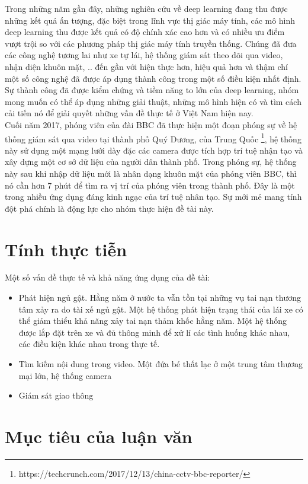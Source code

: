 \documentclass[a4paper]{report}
\begin{document}
	Trong những năm gần đây, những nghiên cứu về deep learning đang thu được
những kết quả ấn tượng, đặc biệt trong lĩnh vực thị giác máy tính, các mô 
hình deep learning thu được kết quả có độ chính xác cao hơn và có nhiều ưu 
điểm vượt trội so với các
phương pháp thị giác máy tính truyền thống. Chúng đã đưa các công nghệ tương lai
 như xe tự lái, hệ thống giám sát theo dõi qua video, nhận diện khuôn mặt, .. đến 
 gần với hiện thực hơn, hiệu quả hơn và thậm chí một số công nghệ đã được áp dụng 
 thành công trong một số điều kiện nhất định. Sự thành công đã được kiểm chứng và 
 tiềm năng to lớn của deep learning, nhóm mong muốn có thể áp dụng những giải thuật, 
 những mô hình hiện có và tìm cách cải tiến nó để giải quyết những vấn đề thực tế ở Việt Nam hiện nay. \\
 
 Cuối năm 2017, phóng viên của đài BBC đã thực hiện một đoạn phóng sự về hệ thống giám sát qua video tại thành phố Quý Dương,
 của Trung Quốc \footnote{https://techcrunch.com/2017/12/13/china-cctv-bbc-reporter/}, hệ thống này sử dụng một mạng lưới dày 
 đặc các camera được tích hợp trí tuệ nhận tạo và xây dựng một cơ sở dữ liệu của người dân thành phố. Trong phóng sự, hệ thống 
 này sau khi nhập dữ liệu mới là nhân dạng khuôn mặt của phóng viên BBC, thì nó cần hơn 7
  phút để tìm ra vị trí của phóng viên trong thành phố. Đây là một trong nhiều ứng dụng đáng kinh ngạc 
  của trí tuệ nhân tạo. Sự mới mẻ mang tính đột phá chính là động lực cho nhóm thực hiện đề tài này.

\section{Tính thực tiễn}
Một số vấn đề thực tế và khả năng ứng dụng của đề tài:
\begin{itemize}
\item Phát hiện ngủ gật. Hằng năm ở nước ta vẫn tồn tại những vụ tai nạn thương tâm xảy 
ra do tài xế ngủ gật. Một hệ thống phát hiện trạng thái của lái xe có thể giảm thiểu khả 
năng xảy tai nạn thảm khốc hằng năm. Một hệ thống được lắp đặt trên xe và đủ thông minh 
để xử lí các tình huống khác nhau, các điều kiện khác nhau trong thực tế. 

\item Tìm kiếm nội dung trong video. Một đứa bé thất lạc ở một trung tâm thương mại lớn,
 hệ thống camera     
\item Giám sát giao thông
\end{itemize}
\section{Mục tiêu của luận văn}
\end{document}
